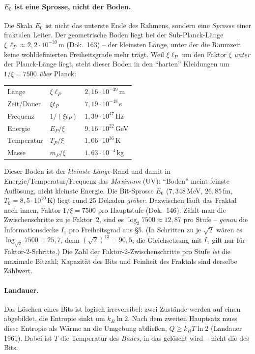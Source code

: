 \paragraph{$E_0$ ist eine Sprosse, nicht der Boden.} Die Skala $E_0$ ist nicht das unterste Ende des
Rahmens, sondern eine \emph{Sprosse} einer fraktalen Leiter. Der geometrische Boden liegt bei der
Sub-Planck-Länge $\xi\,\ell_P\approx2{,}2\cdot10^{-39}$\,m (Dok.~163) -- der kleinsten Länge, unter der die
Raumzeit keine wohldefinierten Freiheitsgrade mehr trägt. Weil $\xi\ell_P$ um den Faktor $\xi$
\emph{unter} der Planck-Länge liegt, steht dieser Boden in den \enquote{harten} Kleidungen um $1/\xi=7500$
\emph{über} Planck:
\begin{center}
\begin{tabular}{@{}lll@{}}
Länge & $\xi\ell_P$ & $2{,}16\cdot10^{-39}$\,m\\
Zeit/Dauer & $\xi t_P$ & $7{,}19\cdot10^{-48}$\,s\\
Frequenz & $1/(\xi t_P)$ & $1{,}39\cdot10^{47}$\,Hz\\
Energie & $E_P/\xi$ & $9{,}16\cdot10^{22}$\,GeV\\
Temperatur & $T_P/\xi$ & $1{,}06\cdot10^{36}$\,K\\
Masse & $m_P/\xi$ & $1{,}63\cdot10^{-4}$\,kg\\
\end{tabular}
\end{center}
Dieser Boden ist der \emph{kleinste-Länge}-Rand und damit in Energie/Temperatur/Frequenz das
\emph{Maximum} (UV): \enquote{Boden} meint feinste Auflösung, nicht kleinste Energie. Die Bit-Sprosse
$E_0$ ($7{,}348$\,MeV, $26{,}85$\,fm, $T_0=8{,}5\cdot10^{10}$\,K) liegt rund $25$ Dekaden \emph{gröber}.
Dazwischen läuft das Fraktal nach innen, Faktor $1/\xi=7500$ pro Hauptstufe (Dok.~146). Zählt man die
Zwischenschritte zu je Faktor~$2$, sind es $\log_2 7500\approx12{,}87$ pro Stufe -- \emph{genau} die
Informationsdecke $I_1$ pro Freiheitsgrad aus §5. (In Schritten zu je $\sqrt2$ wären es
$\log_{\sqrt2}7500=25{,}7$, denn $(\sqrt2)^{13}=90{,}5$; die Gleichsetzung mit $I_1$ gilt nur für
Faktor-2-Schritte.) Die Zahl der Faktor-2-Zwischenschritte pro Stufe \emph{ist} die maximale Bitzahl;
Kapazität des Bits und Feinheit des Fraktals sind derselbe Zählwert.

\paragraph{Landauer.} Das Löschen eines Bits ist logisch irreversibel: zwei Zustände werden auf einen
abgebildet, die Entropie sinkt um $k_B\ln2$. Nach dem zweiten Hauptsatz muss diese Entropie als Wärme an
die Umgebung abfließen, $Q\ge k_B T\ln2$ (Landauer 1961). Dabei ist $T$ die Temperatur des \emph{Bades},
in das gelöscht wird -- nicht die des Bits.

